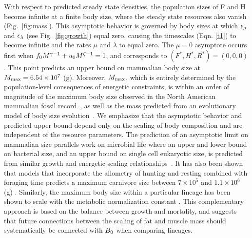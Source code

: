 \documentclass[twocolumn,preprintnumbers,amsmath,amssymb,superscriptaddress]{revtex4}
\begin{document}
With respect to predicted steady state densities, the population sizes of F and H become infinite at a finite body size, where the steady state resources also vanish (Fig.~\ref{fig:mass}). 
This asymptotic behavior is governed by body sizes at which $\epsilon_{\rm \mu}$ and
$\epsilon_{\rm \lambda}$ (see Fig.~\ref{fig:growth}) equal zero, causing the
timescales (Eqn. \ref{t1}) to become infinite and the rates $\mu$ and $\lambda$ to equal
zero.
The $\mu=0$ asymptote occurs first when
$f_{\rm 0}M^{\gamma-1}+u_{\rm 0}M^{\zeta-1}=1$, and corresponds to
$(F^*,H^*,R^*)=(0,0,0)$.  This point predicts an upper bound on mammalian
body size at $M_{\rm \rm max}=6.54\times10^7$ (g).  Moreover, $M_{\rm \rm max}$,
which is entirely determined by the population-level consequences of
energetic constraints, is within an order of magnitude of the maximum body
size observed in the North American mammalian fossil
record~\citep{Alroy:1998p1594}, as well as the mass predicted from an
evolutionary model of body size evolution~\citep{Clauset:2009fh}.  We
emphasize that the asymptotic behavior and predicted upper bound depend only
on the scaling of body composition and are independent of the resource
parameters.  The prediction of an asymptotic limit on mammalian size
parallels work on microbial life where an upper and lower bound on bacterial
size, and an upper bound on single cell eukaryotic size, is predicted from
similar growth and energetic scaling
relationships~\citep{Kempes:2012hy,Kempes:2016}.  It has also been shown that
models that incorporate the allometry of hunting and resting combined with
foraging time predicts a maximum carnivore size between $7\times10^{5}$ and
$1.1\times10^{6}$ (g) \citep{Carbone:1999ju,Carbone:2007dz}.  Similarly, the
maximum body size within a particular lineage has been shown to scale with
the metabolic normalization constant
\citep{Okie:2013ju}. %
This complementary approach is based on the balance between growth and
mortality, and suggests that future connections between the scaling of fat
and muscle mass should systematically be connected with $B_{\rm 0}$ when
comparing
lineages. 
\end{document}
